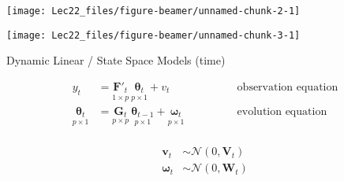 \documentclass[11pt,ignorenonframetext,]{beamer}
\begin{document}
\begin{frame}{}
\protect\hypertarget{section}{}

\begin{center}\texttt{[image: Lec22\_files/figure-beamer/unnamed-chunk-2-1]} \end{center}

\end{frame}

\begin{frame}{}
\protect\hypertarget{section-1}{}

\begin{center}\texttt{[image: Lec22\_files/figure-beamer/unnamed-chunk-3-1]} \end{center}

\end{frame}

\begin{frame}{Dynamic Linear / State Space Models (time)}
\protect\hypertarget{dynamic-linear-state-space-models-time}{}

\[ 
\begin{aligned}
{{y}_t} &= \underset{1 \times p}{\symbf{F}'_t} ~ \underset{p \times 1}{\symbf{\theta}_t} + {{v}_t} 
&\qquad\qquad\text{observation equation}\\
\underset{p\times 1}{\symbf{\theta}_t} &= \underset{p \times p}{\symbf{G}_t} ~ \underset{p \times 1}{\symbf{\theta}_{t-1}}+ \underset{p \times 1}{\symbf{\omega}_t}
&\qquad\qquad\text{evolution equation}\\ 
\end{aligned}
\]

\[ 
\begin{aligned}
\symbf{v}_t &\sim \mathcal{N}(0,\symbf{V}_t) \\
\symbf{\omega}_t &\sim \mathcal{N}(0,\symbf{W}_t) \\
\end{aligned}
\]

\end{frame}
\end{document}
